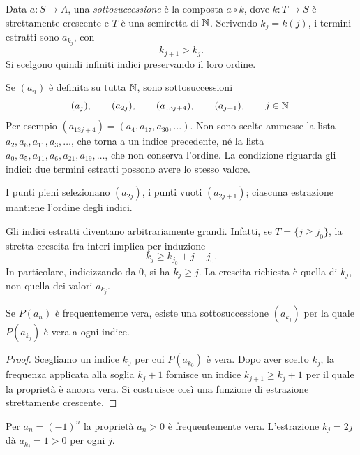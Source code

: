 \begin{definizione}
Data $a\colon S\to A$, una \emph{sottosuccessione} è la composta $a\circ k$, dove $k\colon T\to S$ è strettamente crescente e $T$ è una semiretta di $\mathbb{N}$. Scrivendo $k_j=k(j)$, i termini estratti sono $a_{k_j}$, con
\[
k_{j+1}>k_j.
\]
Si scelgono quindi infiniti indici preservando il loro ordine.
\end{definizione}

\begin{esempio}
Se $(a_n)$ è definita su tutta $\mathbb{N}$, sono sottosuccessioni
\[
(a_j),\qquad (a_{2j}),\qquad (a_{13j+4}),\qquad (a_{j+1}),
\qquad j\in\mathbb{N}.
\]
Per esempio $(a_{13j+4})=(a_4,a_{17},a_{30},\ldots)$. Non sono scelte ammesse la lista $a_2,a_6,a_{11},a_3,\ldots$, che torna a un indice precedente, né la lista $a_0,a_5,a_{11},a_6,a_{21},a_{19},\ldots$, che non conserva l'ordine. La condizione riguarda gli indici: due termini estratti possono avere lo stesso valore.
\end{esempio}

\begin{schema}
\par\smallskip I punti pieni selezionano $(a_{2j})$, i punti vuoti $(a_{2j+1})$; ciascuna estrazione mantiene l'ordine degli indici.
\end{schema}

Gli indici estratti diventano arbitrariamente grandi. Infatti, se $T=\{j\ge j_0\}$, la stretta crescita fra interi implica per induzione
\[
k_j\ge k_{j_0}+j-j_0.
\]
In particolare, indicizzando da $0$, si ha $k_j\ge j$. La crescita richiesta è quella di $k_j$, non quella dei valori $a_{k_j}$.

\begin{proposizione}
Se $P(a_n)$ è frequentemente vera, esiste una sottosuccessione $(a_{k_j})$ per la quale $P(a_{k_j})$ è vera a ogni indice.
\end{proposizione}
\begin{proof}
Scegliamo un indice $k_0$ per cui $P(a_{k_0})$ è vera. Dopo aver scelto $k_j$, la frequenza applicata alla soglia $k_j+1$ fornisce un indice $k_{j+1}\ge k_j+1$ per il quale la proprietà è ancora vera. Si costruisce così una funzione di estrazione strettamente crescente.
\end{proof}

\begin{esempio}
Per $a_n=(-1)^n$ la proprietà $a_n>0$ è frequentemente vera. L'estrazione $k_j=2j$ dà $a_{k_j}=1>0$ per ogni $j$.
\end{esempio}
